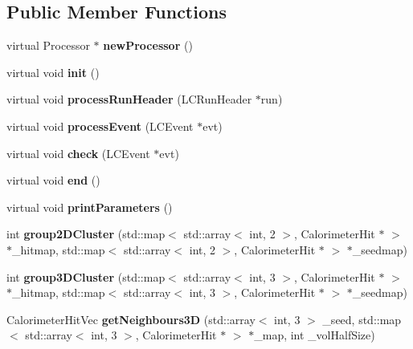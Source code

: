 \subsection*{Public Member Functions}
\begin{DoxyCompactItemize}
\item 
virtual Processor $\ast$ {\bfseries new\-Processor} ()\label{classCALICE_1_1ClusterCounter_a2668a900c7d219826c97540555494823}

\item 
virtual void {\bfseries init} ()\label{classCALICE_1_1ClusterCounter_ac086e9b47fc8b7006479a762cd4e5205}

\item 
virtual void {\bfseries process\-Run\-Header} (L\-C\-Run\-Header $\ast$run)\label{classCALICE_1_1ClusterCounter_abc6eae26572f0a17304cf0a00b001bff}

\item 
virtual void {\bfseries process\-Event} (L\-C\-Event $\ast$evt)\label{classCALICE_1_1ClusterCounter_a6cc282e45a6f542eff586fd06b2d2d64}

\item 
virtual void {\bfseries check} (L\-C\-Event $\ast$evt)\label{classCALICE_1_1ClusterCounter_ad8bd193bd992b3a9c1081167fcebce5d}

\item 
virtual void {\bfseries end} ()\label{classCALICE_1_1ClusterCounter_a06075c6f41de3c59af21b9b26e6a0495}

\item 
virtual void {\bfseries print\-Parameters} ()\label{classCALICE_1_1ClusterCounter_a2369f1d140ba6e4686a949362e9b089c}

\item 
int {\bfseries group2\-D\-Cluster} (std\-::map$<$ std\-::array$<$ int, 2 $>$, Calorimeter\-Hit $\ast$ $>$ $\ast$\-\_\-hitmap, std\-::map$<$ std\-::array$<$ int, 2 $>$, Calorimeter\-Hit $\ast$ $>$ $\ast$\-\_\-seedmap)\label{classCALICE_1_1ClusterCounter_ad8594e8668b029a4c21728c48e197723}

\item 
int {\bfseries group3\-D\-Cluster} (std\-::map$<$ std\-::array$<$ int, 3 $>$, Calorimeter\-Hit $\ast$ $>$ $\ast$\-\_\-hitmap, std\-::map$<$ std\-::array$<$ int, 3 $>$, Calorimeter\-Hit $\ast$ $>$ $\ast$\-\_\-seedmap)\label{classCALICE_1_1ClusterCounter_a4fb3f495fbe2f049f1f8df9fc55d0c45}

\item 
Calorimeter\-Hit\-Vec {\bfseries get\-Neighbours3\-D} (std\-::array$<$ int, 3 $>$ \-\_\-seed, std\-::map$<$ std\-::array$<$ int, 3 $>$, Calorimeter\-Hit $\ast$ $>$ $\ast$\-\_\-map, int \-\_\-vol\-Half\-Size)\label{classCALICE_1_1ClusterCounter_a48b0dc007eea02357fa6254376e01a96}


\end{DoxyCompactItemize}
